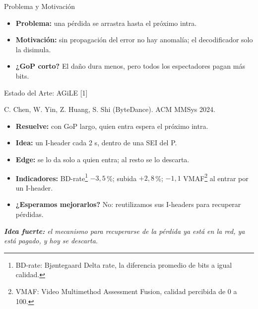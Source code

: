 \documentclass[aspectratio=169, 12pt]{beamer}
\newcommand{\secuencia}[5]{%
  \node[anchor=east, font=\scriptsize] at (-0.2, #1+0.17) {#5};
  \pgfmathtruncatemacro{\proxI}{#4 < 0 ? -1 : (floor(#4/#2)+1)*#2}%
  \pgfmathtruncatemacro{\proxH}{#4 < 0 ? -1 : (#3 == 1 ? min((floor(#4/6)+1)*6, \proxI) : \proxI)}%
  \foreach \i in {0,...,90}{%
    \pgfmathtruncatemacro{\esI}{mod(\i,#2) == 0 ? 1 : 0}%
    \pgfmathtruncatemacro{\estado}{\esI == 1 ? 1 : ((#4 >= 0 && \i >= #4 && \i < \proxH) ? 2 : ((#4 >= 0 && \i >= \proxH && \i < \proxI) ? 3 : 0))}%
    \ifcase\estado \def\col{Suave}\or \def\col{SentricaBlue}\or \def\col{Rojo}\or \def\col{Rojo!25}\fi
    \fill[\col] (\i*0.115, #1) rectangle ++(0.1, 0.34);
  }%
  \ifnum#3=1
    \foreach \k in {6,12,...,90}{%
      \pgfmathtruncatemacro{\esI}{mod(\k,#2) == 0 ? 1 : 0}%
      \ifnum\esI=0 \fill[SentricaBlue] (\k*0.115+0.05, #1+0.42) circle (0.04);\fi
    }%
  \fi
  \ifnum#4>-1 \node[font=\tiny] at (#4*0.115+0.05, #1+0.5) {$\blacktriangledown$};\fi
}
\newcommand{\ejetiempo}[1]{%
  \foreach \s/\f in {0/0, 1/30, 2/60, 3/90}{\node[font=\tiny, text=gray] at (\f*0.115+0.05, #1) {\s\,s};}
}
\begin{document}
\begin{frame}{Problema y Motivación}
    \begin{itemize}
        \item \textbf{Problema:} una pérdida se arrastra hasta el próximo intra.
        \item \textbf{Motivación:} sin propagación del error no hay anomalía; el decodificador solo la disimula.
        \item \textbf{¿GoP corto?} El daño dura menos, pero todos los espectadores pagan más bits.
    \end{itemize}

    \vspace{0.4cm}
    \centering
\end{frame}

\begin{frame}{Estado del Arte: AGiLE [1]}
    {\scriptsize\color{gray} C. Chen, W. Yin, Z. Huang, S. Shi (ByteDance). ACM MMSys 2024.\par}
    \vspace{0.1cm}
    \begin{itemize}
        \item \textbf{Resuelve:} con GoP largo, quien entra espera el próximo intra.
        \item \textbf{Idea:} un I-header cada 2 s, dentro de una SEI del P.
        \item \textbf{Edge:} se lo da solo a quien entra; al resto se lo descarta.
        \item \textbf{Indicadores:} BD-rate\footnote{BD-rate: Bjøntegaard Delta rate, la diferencia promedio de bits a igual calidad.} $-3{,}5$\,\%; subida $+2{,}8$\,\%; $-1{,}1$ VMAF\footnote{VMAF: Video Multimethod Assessment Fusion, calidad percibida de 0 a 100.} al entrar por un I-header.
        \item \textbf{¿Esperamos mejorarlos?} No: reutilizamos sus I-headers para recuperar pérdidas.
    \end{itemize}

    \vspace{0.2cm}
    {\itshape \small \textcolor{SentricaBlue}{
    \textbf{Idea fuerte:} el mecanismo para recuperarse de la pérdida ya está en la red, ya está pagado, y hoy se descarta.
    }\par}
\end{frame}
\end{document}
